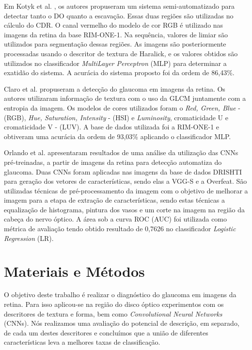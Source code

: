 \documentclass[fleqn,10pt]{SelfArx} %
\begin{document}
Em Kotyk et al. \cite{kotyk2016semi}, os autores propuseram um sistema semi-automatizado para detectar tanto o DO quanto a escavação. Essas duas regiões são utilizadas no cálculo do CDR. O canal vermelho do modelo de cor RGB é utilizado nas imagens da retina da base RIM-ONE-1. Na sequência, valores de limiar são utilizados para segmentação dessas regiões. As imagens são posteriormente processadas usando o descritor de textura de Haralick, e os valores obtidos são utilizados no classificador \textit{MultiLayer Perceptron} (MLP) para determinar a exatidão do sistema. A acurácia do sistema proposto foi da ordem de 86,43\%.


Claro et al. \cite{claro2016automatic} propuseram a detecção do glaucoma em imagens da retina. Os autores utilizaram informação de textura com o uso da GLCM juntamente com a entropia da imagem. Os modelos de cores utilizados foram o \textit{Red, Green, Blue} - (RGB), \textit{Hue, Saturation, Intensity} - (HSI) e \textit{Luminosity}, cromaticidade U e cromaticidade V - (LUV). A base de dados utilizada foi a RIM-ONE-1 e obtiveram uma acurácia da ordem de 93,03\% aplicando o classificador MLP.

Orlando et al. \cite{orlando2017convolutional} apresentaram resultados de uma análise da utilização das CNNs pré-treinadas, a partir de imagens da retina para detecção automatiza do glaucoma. Duas CNNs foram aplicadas nas imagens da base de dados DRISHTI para geração dos vetores de características, sendo elas a VGG-S e a Overfeat. São utilizadas técnicas de pré-processamento da imagem com o objetivo de melhorar a imagem para a etapa de extração de características, sendo estas técnicas a equalização de histograma, pintura dos vasos e um corte na imagem na região da cabeça do nervo óptico. A área sob a curva ROC (AUC) foi utilizada como métrica de avaliação tendo obtido resultado de 0,7626 no classificador \textit{Logistic Regression} (LR).

\section{Materiais e Métodos} 
\label{MM}

O objetivo deste trabalho é realizar o diagnóstico do glaucoma em imagens da retina. Para isso aplicou-se na região do disco óptico experimentos com os descritores de textura e forma, bem como \textit{Convolutional Neural Networks} (CNNs). Nós realizamos uma avaliação do potencial de descrição, em separado, de cada um destes descritores e concluímos que a união de diferentes características leva a melhores taxas de classificação.
\end{document}
